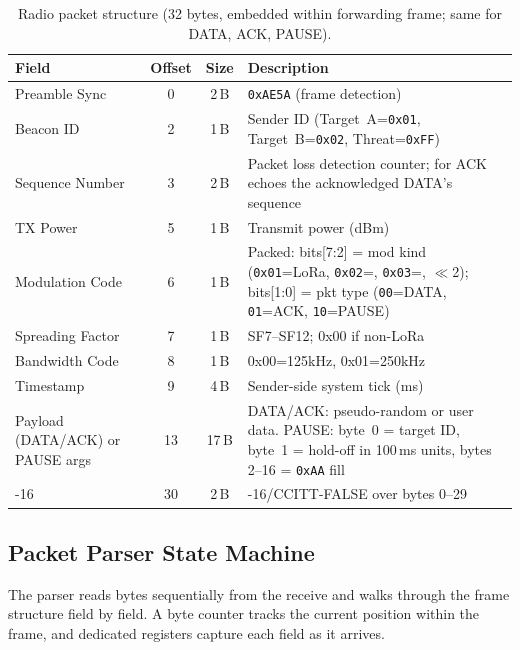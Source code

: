 \documentclass[11pt,letterpaper]{article}
\begin{document}
	\begin{table}[ht!]
		\centering
		\caption{Radio packet structure (32 bytes, embedded within forwarding frame; same for DATA, ACK, PAUSE).}
		\label{tab:beacon_recap}
		\renewcommand{\arraystretch}{1.3}
		\begin{tabularx}{\textwidth}{l c c X}
			\toprule
			\textbf{Field} & \textbf{Offset} & \textbf{Size} & \textbf{Description} \\
			\midrule
			Preamble Sync & 0 & 2\,B & \texttt{0xAE5A} (frame detection) \\
			Beacon ID & 2 & 1\,B & Sender ID (Target~A=\texttt{0x01}, Target~B=\texttt{0x02}, Threat=\texttt{0xFF}) \\
			Sequence Number & 3 & 2\,B & Packet loss detection counter; for ACK echoes the acknowledged DATA's sequence \\
			TX Power & 5 & 1\,B & Transmit power (dBm) \\
			Modulation Code & 6 & 1\,B & Packed: bits[7:2] = mod kind (\texttt{0x01}=LoRa, \texttt{0x02}=\FSK{}, \texttt{0x03}=\OOK{}, $\ll$2); bits[1:0] = pkt type (\texttt{00}=DATA, \texttt{01}=ACK, \texttt{10}=PAUSE) \\
			Spreading Factor & 7 & 1\,B & SF7--SF12; 0x00 if non-LoRa \\
			Bandwidth Code & 8 & 1\,B & 0x00=125kHz, 0x01=250kHz \\
			Timestamp & 9 & 4\,B & Sender-side system tick (ms) \\
			Payload (DATA/ACK) or PAUSE args & 13 & 17\,B & DATA/ACK: pseudo-random or user data. PAUSE: byte~0 = target ID, byte~1 = hold-off in 100\,ms units, bytes 2--16 = \texttt{0xAA} fill \\
			\CRC{}-16 & 30 & 2\,B & \CRC{}-16/CCITT-FALSE over bytes 0--29 \\
			\bottomrule
		\end{tabularx}
	\end{table}

	\subsection{Packet Parser State Machine}

	The parser reads bytes sequentially from the receive \FIFO{} and walks through the frame structure field by field. A byte counter tracks the current position within the frame, and dedicated registers capture each field as it arrives.
\end{document}
